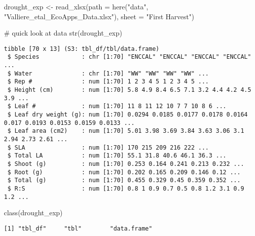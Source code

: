 \documentclass[
  letterpaper,
  DIV=11,
  numbers=noendperiod]{scrartcl}
\newenvironment{Shaded}{\begin{snugshade}}{\end{snugshade}}
\newcommand{\AttributeTok}[1]{\textcolor[rgb]{0.40,0.45,0.13}{#1}}
\newcommand{\CommentTok}[1]{\textcolor[rgb]{0.37,0.37,0.37}{#1}}
\newcommand{\FunctionTok}[1]{\textcolor[rgb]{0.28,0.35,0.67}{#1}}
\newcommand{\NormalTok}[1]{\textcolor[rgb]{0.00,0.23,0.31}{#1}}
\newcommand{\OtherTok}[1]{\textcolor[rgb]{0.00,0.23,0.31}{#1}}
\newcommand{\StringTok}[1]{\textcolor[rgb]{0.13,0.47,0.30}{#1}}
\begin{document}
\begin{Shaded}
\begin{Highlighting}[]
\NormalTok{drought\_exp }\OtherTok{\textless{}{-}} \FunctionTok{read\_xlsx}\NormalTok{(}\AttributeTok{path =} \FunctionTok{here}\NormalTok{(}\StringTok{"data"}\NormalTok{, }
                                     \StringTok{"Valliere\_etal\_EcoApps\_Data.xlsx"}\NormalTok{),}
                         \AttributeTok{sheet =} \StringTok{"First Harvest"}\NormalTok{)}

\CommentTok{\# quick look at data }
\FunctionTok{str}\NormalTok{(drought\_exp)}
\end{Highlighting}
\end{Shaded}

\begin{verbatim}
tibble [70 x 13] (S3: tbl_df/tbl/data.frame)
 $ Species            : chr [1:70] "ENCCAL" "ENCCAL" "ENCCAL" "ENCCAL" ...
 $ Water              : chr [1:70] "WW" "WW" "WW" "WW" ...
 $ Rep #              : num [1:70] 1 2 3 4 5 1 2 3 4 5 ...
 $ Height (cm)        : num [1:70] 5.8 4.9 8.4 6.5 7.1 3.2 4.4 4.2 4.5 3.9 ...
 $ Leaf #             : num [1:70] 11 8 11 12 10 7 7 10 8 6 ...
 $ Leaf dry weight (g): num [1:70] 0.0294 0.0185 0.0177 0.0178 0.0164 0.017 0.0193 0.0153 0.0159 0.0133 ...
 $ Leaf area (cm2)    : num [1:70] 5.01 3.98 3.69 3.84 3.63 3.06 3.1 2.94 2.73 2.61 ...
 $ SLA                : num [1:70] 170 215 209 216 222 ...
 $ Total LA           : num [1:70] 55.1 31.8 40.6 46.1 36.3 ...
 $ Shoot (g)          : num [1:70] 0.253 0.164 0.241 0.213 0.232 ...
 $ Root (g)           : num [1:70] 0.202 0.165 0.209 0.146 0.12 ...
 $ Total (g)          : num [1:70] 0.455 0.329 0.45 0.359 0.352 ...
 $ R:S                : num [1:70] 0.8 1 0.9 0.7 0.5 0.8 1.2 3.1 0.9 1.2 ...
\end{verbatim}

\begin{Shaded}
\begin{Highlighting}[]
\FunctionTok{class}\NormalTok{(drought\_exp)}
\end{Highlighting}
\end{Shaded}

\begin{verbatim}
[1] "tbl_df"     "tbl"        "data.frame"
\end{verbatim}
\end{document}
